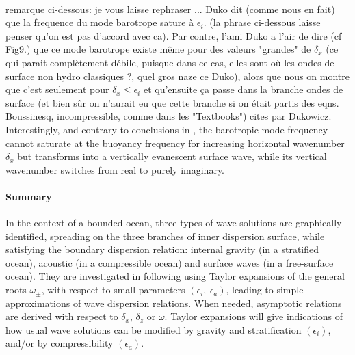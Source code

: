 \\
{\color{red}remarque ci-dessous: je vous laisse rephraser ... Duko dit (comme nous en fait) que la frequence du mode barotrope sature à $\epsilon_i$. (la phrase ci-dessous laisse penser qu'on est pas d'accord avec ca). Par contre, l'ami Duko a l'air de dire (cf Fig9.) que ce mode barotrope existe même pour des valeurs "grandes" de $\delta_x$ (ce qui parait complètement débile, puisque dans ce cas, elles sont où les ondes de surface non hydro classiques ?, quel gros naze ce Duko), alors que nous on montre que c'est seulement pour $\delta_x\le \epsilon_i$ et qu'ensuite ça passe dans la branche ondes de surface (et bien sûr on n'aurait eu que cette branche si on était partis des eqns.  Boussinesq, incompressible, comme dans les "Textbooks") cites par Dukowicz.}
Interestingly,  and contrary to conclusions in \cite{dukowicz_2013}, the barotropic mode frequency cannot saturate at the buoyancy frequency for increasing horizontal wavenumber $\delta_x$ but transforms into a vertically evanescent surface wave, while its vertical wavenumber switches from real to purely imaginary.

\paragraph{Summary}
In the context of a bounded ocean, three types of wave solutions are graphically identified, spreading on the three branches of inner dispersion surface, while satisfying the boundary dispersion relation: internal gravity (in a stratified ocean), acoustic (in a compressible ocean) and surface waves (in a free-surface ocean). They are investigated in following using Taylor expansions of the general roots $\omega_{\pm}$, with respect to small parameters $(\epsilon_i,\ \epsilon_a)$, leading to simple approximations of wave dispersion relations. When needed, asymptotic relations are derived with respect to $\delta_x$, $\delta_z$ or $\omega$. Taylor expansions will give indications of how usual wave solutions can be modified by gravity and stratification $(\epsilon_i)$, and/or by compressibility $(\epsilon_a)$.
